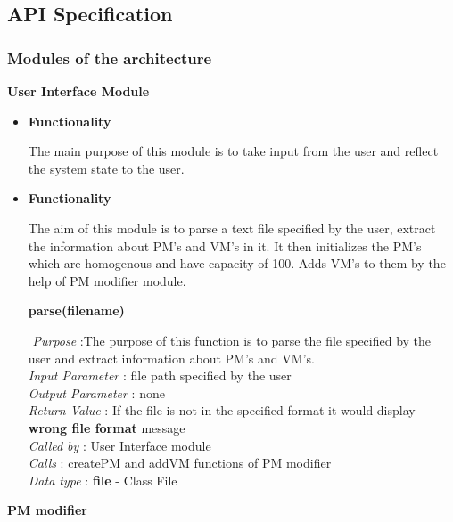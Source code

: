 \documentclass[a4paper,11pt]{article}
\begin{document}
\subsection{API Specification}
\subsubsection{Modules of the architecture }
\textbf{User Interface Module}
\begin{itemize}
 \item \textbf{Functionality}
 
 The main purpose of this module is to take input from the user and reflect the system state to the user.
 \end{itemize}

\begin{itemize}
\item \textbf{Functionality}

The aim of this module is to parse a text file specified by the user, extract the information about PM's and VM's in it.
It then initializes the PM's which are homogenous and have capacity of 100. Adds VM's to them by the help of PM modifier module.



\textbf{parse(filename)}
  
\begin{tabbing}
\hspace*{3.2cm}\= \kill
 \textit{Purpose} \> :The purpose of this function is to parse the file specified by the \\ \>user and extract information about PM's and VM's.\\
  \textit{Input Parameter} \> : file path specified by the user \\
  \textit{Output Parameter} \> : none \\
  \textit{Return Value} \> : If the file is not in the specified format it would display \\ \>\textbf{wrong file format} message \\
  \textit{Called by} \> : User Interface module \\
  \textit{Calls} \> : createPM and addVM functions of PM modifier\\
  \textit{Data type} \> : \textbf{file} - Class File
\end{tabbing}
\end{itemize}
\textbf{PM modifier}
\end{document}
